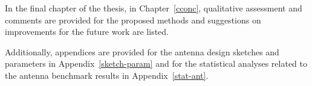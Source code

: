 \documentclass[12pt, oneandhalf, chaparabic, sees, ms]{metu}
\begin{document}
In the final chapter of the thesis, in Chapter~\ref{cconc}, qualitative assessment and comments are provided for the proposed methods
and suggestions on improvements for the future work are listed.

Additionally, appendices are provided for the antenna design sketches and parameters in Appendix~\ref{sketch-param} and
for the statistical analyses related to the antenna benchmark results in Appendix~\ref{stat-ant}. 
% 

\newpage

\end{document}
